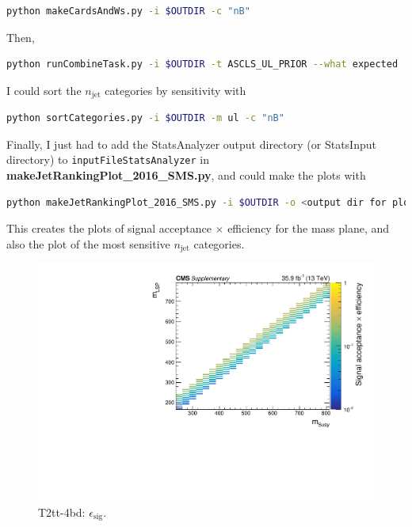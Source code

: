 \begin{lstlisting}[belowskip=-0.7cm, language=sh, numbers=none]
python makeCardsAndWs.py -i $OUTDIR -c "nB"
\end{lstlisting}

Then,

\begin{lstlisting}[belowskip=-0.7cm, language=sh, numbers=none]
python runCombineTask.py -i $OUTDIR -t ASCLS_UL_PRIOR --what expected
\end{lstlisting}

I could sort the $n_{\mathrm{jet}}$ categories by sensitivity with

\begin{lstlisting}[belowskip=-0.7cm, language=sh, numbers=none]
python sortCategories.py -i $OUTDIR -m ul -c "nB"
\end{lstlisting}

Finally, I just had to add the StatsAnalyzer output directory (or StatsInput directory) to \texttt{inputFileStatsAnalyzer} in \textbf{makeJetRankingPlot\_2016\_SMS.py}, and could make the plots with

\begin{lstlisting}[belowskip=-0.7cm, language=sh, numbers=none]
python makeJetRankingPlot_2016_SMS.py -i $OUTDIR -o <output dir for plots>
\end{lstlisting}

This creates the plots of signal acceptance $\times$ efficiency for the mass plane, and also the plot of the most sensitive $n_{\mathrm{jet}}$ categories. 

\begin{figure}[H]
\centering
\includegraphics[width=120mm]{./sec31/T2tt_sig_acc_eff.pdf}
\caption{T2tt-4bd: $\epsilon_{\mathrm{sig}}$.}
\end{figure}

